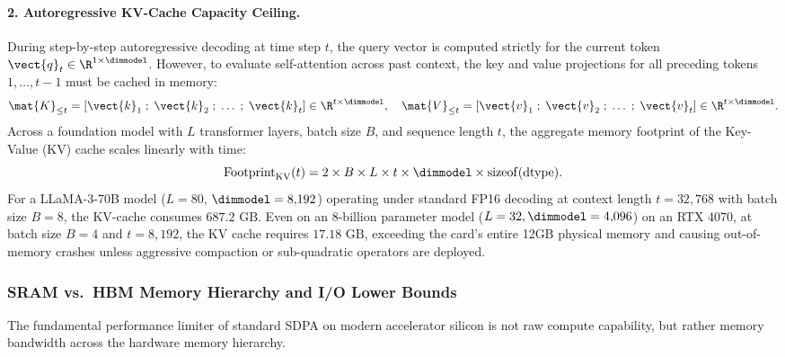 \paragraph{2. Autoregressive KV-Cache Capacity Ceiling.}
During step-by-step autoregressive decoding at time step $t$, the query vector is computed strictly for the current token $\vect{q}_t \in \R^{1 \times \dimmodel}$. However, to evaluate self-attention across past context, the key and value projections for all preceding tokens $1, \dots, t-1$ must be cached in memory:
\begin{equation}
\mat{K}_{\le t} = \left[ \vect{k}_1 \;;\; \vect{k}_2 \;;\; \dots \;;\; \vect{k}_t \right] \in \R^{t \times \dimmodel}, \quad \mat{V}_{\le t} = \left[ \vect{v}_1 \;;\; \vect{v}_2 \;;\; \dots \;;\; \vect{v}_t \right] \in \R^{t \times \dimmodel}.
\end{equation}
Across a foundation model with $L$ transformer layers, batch size $B$, and sequence length $t$, the aggregate memory footprint of the Key-Value (KV) cache scales linearly with time:
\begin{equation}
\operatorname{Footprint}_{\text{KV}}(t) = 2 \times B \times L \times t \times \dimmodel \times \operatorname{sizeof}(\text{dtype}).
\label{eq:kv_cache_scaling_formula}
\end{equation}
For a LLaMA-3-70B model ($L = 80$, $\dimmodel = 8{,}192$) operating under standard FP16 decoding at context length $t = 32{,}768$ with batch size $B = 8$, the KV-cache consumes $687.2\text{ GB}$. Even on an 8-billion parameter model ($L = 32, \dimmodel = 4{,}096$) on an RTX 4070, at batch size $B=4$ and $t=8{,}192$, the KV cache requires $17.18\text{ GB}$, exceeding the card's entire 12GB physical memory and causing out-of-memory crashes unless aggressive compaction or sub-quadratic operators are deployed.

\subsubsection{SRAM vs.\ HBM Memory Hierarchy and I/O Lower Bounds}
\label{subsubsec:sram_hbm_io_bounds}
The fundamental performance limiter of standard SDPA on modern accelerator silicon is not raw compute capability, but rather memory bandwidth across the hardware memory hierarchy.

